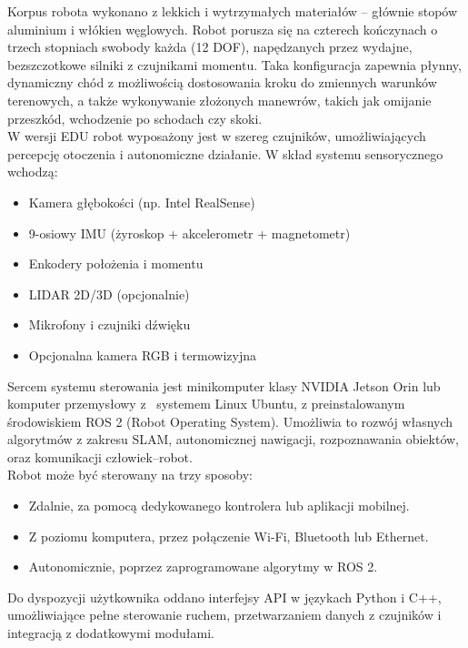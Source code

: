 \documentclass[12pt]{article}
\begin{document}
\noindent Korpus robota wykonano z lekkich i wytrzymałych materiałów – głównie stopów aluminium i włókien węglowych. Robot porusza się na czterech kończynach o trzech stopniach swobody każda (12 DOF), napędzanych przez wydajne, bezszczotkowe silniki z czujnikami momentu. Taka konfiguracja zapewnia płynny, dynamiczny chód z możliwością dostosowania kroku do zmiennych warunków terenowych, a także wykonywanie złożonych manewrów, takich jak omijanie przeszkód, wchodzenie po schodach czy skoki.\\

\noindent W wersji EDU robot wyposażony jest w szereg czujników, umożliwiających percepcję otoczenia i autonomiczne działanie. W skład systemu sensorycznego wchodzą:
\begin{itemize}
    \item Kamera głębokości (np. Intel RealSense)
    \item 9-osiowy IMU (żyroskop + akcelerometr + magnetometr)
    \item Enkodery położenia i momentu
    \item LIDAR 2D/3D (opcjonalnie)
    \item Mikrofony i czujniki dźwięku
    \item Opcjonalna kamera RGB i termowizyjna
\end{itemize}

\noindent Sercem systemu sterowania jest minikomputer klasy NVIDIA Jetson Orin lub komputer przemysłowy z~ systemem Linux Ubuntu, z preinstalowanym środowiskiem ROS 2 (Robot Operating System). Umożliwia to rozwój własnych algorytmów z zakresu SLAM, autonomicznej nawigacji, rozpoznawania obiektów, oraz komunikacji człowiek–robot.\\


\noindent Robot może być sterowany na trzy sposoby:
\begin{itemize}
    \item Zdalnie, za pomocą dedykowanego kontrolera lub aplikacji mobilnej.
    \item Z poziomu komputera, przez połączenie Wi-Fi, Bluetooth lub Ethernet.
    \item Autonomicznie, poprzez zaprogramowane algorytmy w ROS 2.
\end{itemize}
Do dyspozycji użytkownika oddano interfejsy API w językach Python i C++, umożliwiające pełne sterowanie ruchem, przetwarzaniem danych z czujników i integracją z dodatkowymi modułami.\\
\end{document}
